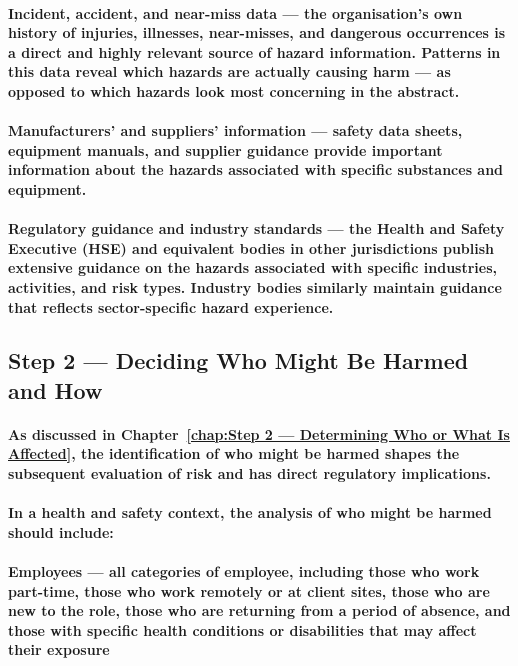 \paragraph{\textbf{Incident, accident, and near-miss data} — the organisation's own history of injuries, illnesses, near-misses, and dangerous occurrences is a direct and highly relevant source of hazard information. Patterns in this data reveal which hazards are actually causing harm — as opposed to which hazards look most concerning in the abstract.}
\paragraph{\textbf{Manufacturers' and suppliers' information} — safety data sheets, equipment manuals, and supplier guidance provide important information about the hazards associated with specific substances and equipment.}
\paragraph{\textbf{Regulatory guidance and industry standards} — the Health and Safety Executive (HSE) and equivalent bodies in other jurisdictions publish extensive guidance on the hazards associated with specific industries, activities, and risk types. Industry bodies similarly maintain guidance that reflects sector-specific hazard experience.}

\subsection{Step 2 — Deciding Who Might Be Harmed and How}
\paragraph{As discussed in Chapter~\ref{chap:Step 2 — Determining Who or What Is Affected}, the identification of who might be harmed shapes the subsequent evaluation of risk and has direct regulatory implications.}
\paragraph{In a health and safety context, the analysis of who might be harmed should include:}
\paragraph{\textbf{Employees} — all categories of employee, including those who work part-time, those who work remotely or at client sites, those who are new to the role, those who are returning from a period of absence, and those with specific health conditions or disabilities that may affect their exposure}
